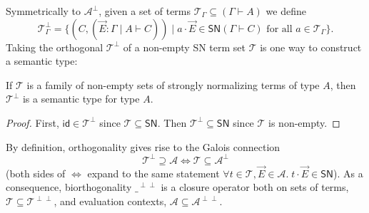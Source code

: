 \documentclass[a4paper,USenglish,cleveref, autoref, thm-restate]{lipics-v2019}
\newcommand{\tid}{\mathsf{id}}
\newcommand{\A}{\mathcal{A}}
\newcommand{\T}{\mathcal{T}}
\newcommand{\SN}{\mathsf{SN}}
\begin{document}
\noindent
Symmetrically to $\A^\perp$, given a set of terms $\T_\Gamma \subseteq
(\Gamma \vdash A)$ we define
\[
  \T_\Gamma^\perp =
  \{ (C, (\vec E : \Gamma \mid A \vdash C)) \mid
  a \cdot \vec E \in \SN(\Gamma \vdash C)
  \mbox{ for all } a \in \T_\Gamma \}
  .
\]
Taking the orthogonal $\T^\perp$ of a non-empty SN term set $\T$ is one way to
construct a semantic type:
\begin{lemma}
  \label{lem:orthsem}
  If $\T$ is a family of non-empty sets of strongly normalizing terms
  of type $A$, then
  $\T^\perp$ is a semantic type for type $A$.
\end{lemma}
\begin{proof}
  First, $\tid \in \T^\perp$ since $\T \subseteq \SN$.
  Then $\T^\perp \subseteq \SN$ since $\T$ is non-empty.
\end{proof}
%
By definition, orthogonality gives rise to the Galois
connection
\[
  \T^\perp \supseteq \A \iff \T \subseteq \A^\perp
\]
(both sides of $\iff$ expand to the same statement $\forall t \in \T,
\vec E \in \A.\; t \cdot \vec E \in \SN$).  As a consequence,
biorthogonality $\_^{\perp\perp}$ is a closure operator both on sets
of terms, $\T \subseteq \T^{\perp\perp}$, and evaluation contexts,
$\A \subseteq \A^{\perp\perp}$.
\end{document}
